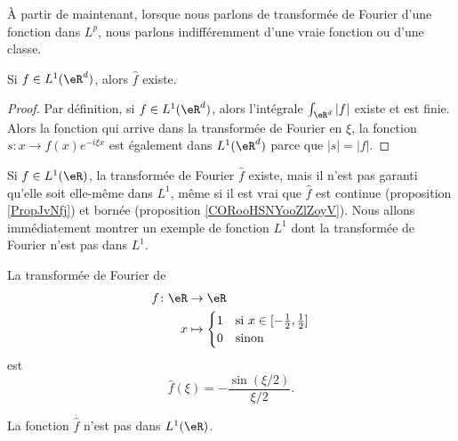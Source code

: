 À partir de maintenant, lorsque nous parlons de transformée de Fourier d'une fonction dans \( L^p\), nous parlons indifféremment d'une vraie fonction ou d'une classe.

\begin{lemma}
	Si \( f\in L^1(\eR^d)\), alors \( \hat f\) existe.
\end{lemma}

\begin{proof}
	Par définition, si \( f\in L^1(\eR^d)\), alors l'intégrale \( \int_{\eR^d}| f |\) existe et est finie. Alors la fonction qui arrive dans la transformée de Fourier en \( \xi\), la fonction \( s\colon x\to f(x) e^{-i\xi x}\) est également dans \( L^1(\eR^d)\) parce que \( | s |=| f |\).
\end{proof}

\begin{normaltext}
	Si \( f\in L^1(\eR)\), la transformée de Fourier \( \hat f\) existe, mais il n'est pas garanti qu'elle soit elle-même dans \( L^1\), même si il est vrai que \( \hat f\) est continue (proposition \ref{PropJvNfj}) et bornée (proposition \ref{CORooHSNYooZlZoyV}). Nous allons immédiatement montrer un exemple de fonction \( L^1\) dont la transformée de Fourier n'est pas dans \( L^1\).
\end{normaltext}

\begin{lemma}       \label{LEMooROPHooOSguhN}
	La transformée de Fourier de
	\begin{equation}
		\begin{aligned}
			f\colon \eR & \to \eR                            \\
			x           & \mapsto \begin{cases}
				1 & \text{si } x\in \mathopen[ -\frac{ 1 }{2} , \frac{ 1 }{2} \mathclose] \\
				0 & \text{sinon }
			\end{cases}
		\end{aligned}
	\end{equation}
	est
	\begin{equation}
		\hat f(\xi)=-\frac{ \sin(\xi/2) }{ \xi/2 }.
	\end{equation}

	La fonction \( \hat f\) n'est pas dans \( L^1(\eR)\).
\end{lemma}


